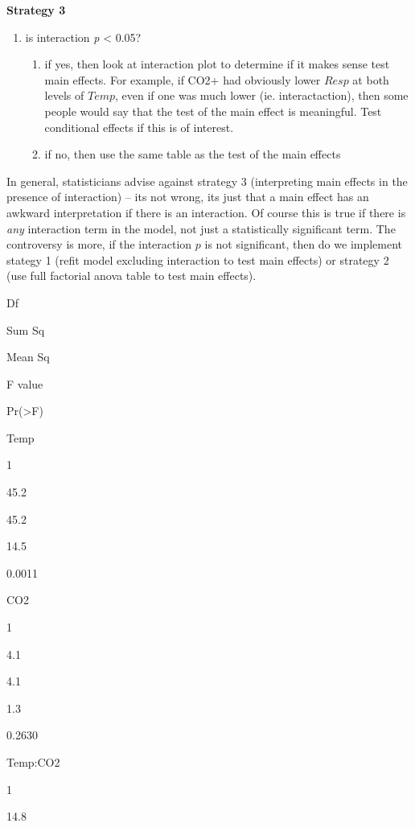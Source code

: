 \documentclass[]{book}
\providecommand{\tightlist}{%
  \setlength{\itemsep}{0pt}\setlength{\parskip}{0pt}}
\begin{document}
\textbf{Strategy 3}

\begin{enumerate}
\def\labelenumi{\arabic{enumi}.}
\setcounter{enumi}{2}
\tightlist
\item
  is interaction \emph{p} \textless{} 0.05?

  \begin{enumerate}
  \def\labelenumii{\alph{enumii}.}
  \tightlist
  \item
    if yes, then look at interaction plot to determine if it makes sense
    test main effects. For example, if CO2+ had obviously lower \(Resp\)
    at both levels of \(Temp\), even if one was much lower (ie.
    interactaction), then some people would say that the test of the
    main effect is meaningful. Test conditional effects if this is of
    interest.
  \item
    if no, then use the same table as the test of the main effects
  \end{enumerate}
\end{enumerate}

In general, statisticians advise against strategy 3 (interpreting main
effects in the presence of interaction) -- its not wrong, its just that
a main effect has an awkward interpretation if there is an interaction.
Of course this is true if there is \emph{any} interaction term in the
model, not just a statistically significant term. The controversy is
more, if the interaction \(p\) is not significant, then do we implement
stategy 1 (refit model excluding interaction to test main effects) or
strategy 2 (use full factorial anova table to test main effects).

Df

Sum Sq

Mean Sq

F value

Pr(\textgreater{}F)

Temp

1

45.2

45.2

14.5

0.0011

CO2

1

4.1

4.1

1.3

0.2630

Temp:CO2

1

14.8
\end{document}
